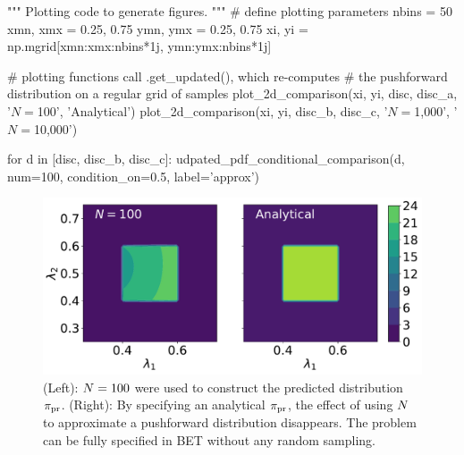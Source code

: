 \begin{python}
"""
Plotting code to generate figures.
"""
# define plotting parameters
nbins = 50
xmn, xmx = 0.25, 0.75
ymn, ymx = 0.25, 0.75
xi, yi = np.mgrid[xmn:xmx:nbins*1j, ymn:ymx:nbins*1j]

# plotting functions call .get_updated(), which re-computes
# the pushforward distribution on a regular grid of samples
plot_2d_comparison(xi, yi, disc, disc_a, '$N=$100', 'Analytical')
plot_2d_comparison(xi, yi, disc_b, disc_c, '$N=$1,000', '$N=$10,000')

for d in [disc, disc_b, disc_c]:
    udpated_pdf_conditional_comparison(d, num=100,
                                       condition_on=0.5,
                                       label='approx')
\end{python}

\begin{figure}[ht]
\begin{minipage}{.975\textwidth}
\includegraphics[width=\linewidth]{./examples/identity/samp/N100_N100-vs-Analytical_N100.pdf}
\end{minipage}
\caption{
(Left): $N=100$ were used to construct the predicted distribution $\operatorname*{\pi_{pr}}$.
(Right): By specifying an analytical $\operatorname*{\pi_{pr}}$, the effect of using $N$ to approximate a pushforward distribution disappears. The problem can be fully specified in BET without any random sampling.
}
\label{fig:ex:identity_sampling_exact}
\end{figure}

